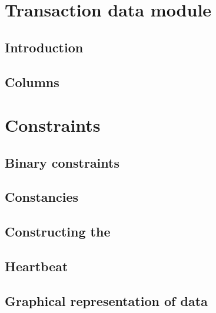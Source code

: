 
\section{Transaction data module}                                           \label{user txn data: generalities}
\subsection{Introduction}                                                   \label{user txn data: generalities: intro}                         
\subsection{Columns}                                                        \label{user txn data: generalities: columns}                       

\section{Constraints}                                                       \label{user txn data: constraints}
\subsection{Binary constraints}                                             \label{user txn data: constraints: binary}                         
\subsection{Constancies}                                                    \label{user txn data: constraints: constancies}                    
\subsection{Constructing the \ABSTXNUM{}}                                   \label{user txn data: constraints: constructing ABS}               
\subsection{Heartbeat}                                                      \label{user txn data: constraints: heartbeat}                      
\subsection{Graphical representation of data}                               \label{user txn data: constraints: graphical representation}       
